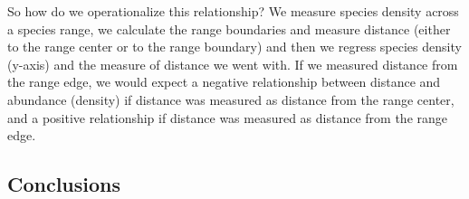 \documentclass[12pt]{article}
\begin{document}
So how do we operationalize this relationship? We measure species density across a species range, we calculate the range boundaries and measure distance (either to the range center or to the range boundary) and then we regress species density (y-axis) and the measure of distance we went with. If we measured distance from the range edge, we would expect a negative relationship between distance and abundance (density) if distance was measured as distance from the range center, and a positive relationship if distance was measured as distance from the range edge. 











\bigskip
\subsection*{Conclusions}
\end{document}
